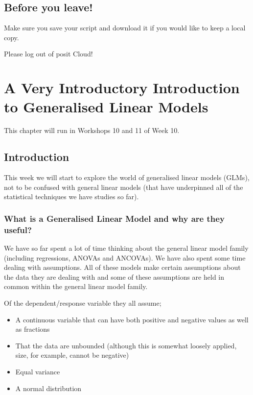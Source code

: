 \documentclass[
]{book}
\providecommand{\tightlist}{%
  \setlength{\itemsep}{0pt}\setlength{\parskip}{0pt}}
\begin{document}
\hypertarget{before-you-leave-10}{%
\section{Before you leave!}\label{before-you-leave-10}}

Make sure you save your script and download it if you would like to keep a local copy.

Please log out of posit Cloud!

\hypertarget{a-very-introductory-introduction-to-generalised-linear-models}{%
\chapter{A Very Introductory Introduction to Generalised Linear Models}\label{a-very-introductory-introduction-to-generalised-linear-models}}

This chapter will run in Workshops 10 and 11 of Week 10.

\hypertarget{introduction-8}{%
\section{Introduction}\label{introduction-8}}

This week we will start to explore the world of generalised linear models (GLMs), not to be confused with general linear models (that have underpinned all of the statistical techniques we have studies so far).

\hypertarget{what-is-a-generalised-linear-model-and-why-are-they-useful}{%
\subsection{What is a Generalised Linear Model and why are they useful?}\label{what-is-a-generalised-linear-model-and-why-are-they-useful}}

We have so far spent a lot of time thinking about the general linear model family (including regressions, ANOVAs and ANCOVAs). We have also spent some time dealing with assumptions. All of these models make certain assumptions about the data they are dealing with and some of these assumptions are held in common within the general linear model family.

Of the dependent/response variable they all assume;

\begin{itemize}
\tightlist
\item
  A continuous variable that can have both positive and negative values as well as fractions
\item
  That the data are unbounded (although this is somewhat loosely applied, size, for example, cannot be negative)
\item
  Equal variance\\
\item
  A normal distribution
\end{itemize}
\end{document}
